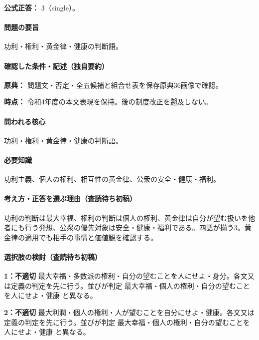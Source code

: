 \textbf{公式正答：} 3（single）。

\paragraph{問題の要旨} 功利・権利・黄金律・健康の判断語。

\paragraph{確認した条件・記述（独自要約）}\mbox{}\par

\noindent\textbf{原典：} 問題文・否定・全五候補と組合せ表を保存原典36画像で確認。\par

\noindent\textbf{時点：} 令和4年度の本文表現を保持。後の制度改正を遡及しない。\par

\paragraph{問われる核心} 功利・権利・黄金律・健康の判断語。

\paragraph{必要知識} 功利主義、個人の権利、相互性の黄金律、公衆の安全・健康・福利。

\paragraph{考え方・正答を選ぶ理由（査読待ち初稿）} 功利の判断は最大幸福、権利の判断は個人の権利、黄金律は自分が望む扱いを他者にも行う発想、公衆の優先対象は安全・健康・福利である。四語が揃う3。黄金律の適用でも相手の事情と価値観を確認する。

\paragraph{選択肢の検討（査読待ち初稿）}\mbox{}\par

\noindent\textbf{1：不適切} 最大幸福・多数派の権利・自分の望むことを人にせよ・身分。各文又は定義の判定を先に行う。並びが判定 最大幸福・個人の権利・自分の望むことを人にせよ・健康 と異なる。\par

\noindent\textbf{2：不適切} 最大利潤・個人の権利・人が望むことを自分にせよ・健康。各文又は定義の判定を先に行う。並びが判定 最大幸福・個人の権利・自分の望むことを人にせよ・健康 と異なる。\par

